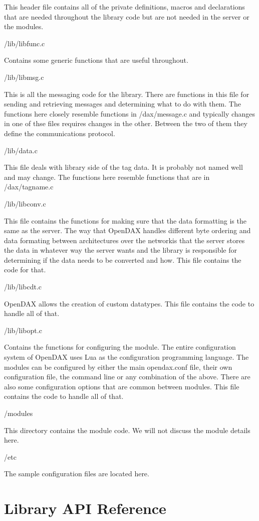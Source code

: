 \documentclass[10pt,letterpaper]{report}
\begin{document}
This header file contains all of the private definitions, macros and declarations that are needed throughout the library code but are not needed in the server or the modules.

/lib/libfunc.c

Contains some generic functions that are useful throughout.

/lib/libmsg.c

This is all the messaging code for the library. There are functions in this file for sending and retrieving messages and determining what to do with them. The functions here closely resemble functions in /dax/message.c and typically changes in one of thse files requires changes in the other. Between the two of them they define the
communications protocol.

/lib/data.c

This file deals with library side of the tag data. It is probably not named well and may change. The functions here resemble functions that are in /dax/tagname.c

/lib/libconv.c

This file contains the functions for making sure that the data formatting is the same as the server. The way that OpenDAX handles different byte ordering and data formating between architectures over the networkis that the server stores the data in whatever way the server wants and the library is responsible for determining if the data needs to be converted and how. This file contains the code for that.

/lib/libcdt.c

OpenDAX allows the creation of custom datatypes. This file contains the code to handle all of that.

/lib/libopt.c

Contains the functions for configuring the module. The entire configuration system of OpenDAX uses Lua as the configuration programming language. The modules can be configured by either the main opendax.conf file, their own configuration file, the command line or any combination of the above. There are also some configuration options that are common between modules. This file contains the code to handle all of that.

/modules

This directory contains the module code. We will not discuss the module details here.

/etc

The sample configuration files are located here.

\chapter{Library API Reference}
\end{document}
